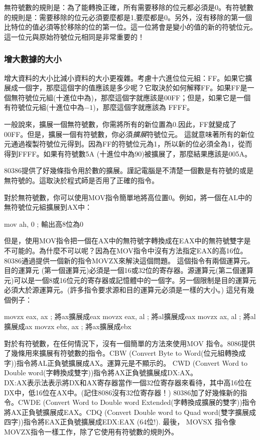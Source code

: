 無符號數的規則是：為了能轉換正確，所有需要移除的位元都必須是0。有符號數的規則是：需要移除的位元必須要麼都是1,要麼都是0。另外，沒有移除的第一個比特位的值必須等於移除的位的第一位。這一位將會是變小的值的新的符號位元。這一位元與原始符號位元相同是非常重要的！

\subsubsection{增大數據的大小}

增大資料的大小比減小資料的大小更複雜。考慮十六進位位元組：FF。如果它擴展成一個字，那麼這個字的值應該是多少呢？它取決於如何解釋FF。如果FF是一個無符號位元組(十進位中為)，那麼這個字就應該是00FF；但是，如果它是一個有符號位元組(十進位中為$-1$)，那麼這個字就應該為
FFFF。

一般說來，擴展一個無符號數，你需將所有的新位置為0.因此，FF就變成了00FF。但是，擴展一個有符號數，你必須\emph{擴展}符號位元。
這就意味著所有的新位元通過複製符號位元得到。因為FF的符號位元為1，所以新的位必須全為1，從而得到FFFF。如果有符號數5A
(十進位中為90)被擴展了，那麼結果應該是005A。

80386提供了好幾條指令用於數的擴展。謹記電腦是不清楚一個數是有符號的或是無符號的。這取決於程式師是否用了正確的指令。

對於無符號數，你可以使用{\code MOV}指令簡單地將高位置0。例如，將一個在AL中的無符號位元組擴展到AX中：
\begin{AsmCodeListing}[numbers=none,frame=none]
      mov    ah, 0   ; 輸出高8位為0
\end{AsmCodeListing}
但是，使用{\code MOV}指令把一個在AX中的無符號字轉換成在EAX中的無符號雙字是不可能的。為什麼不可以呢？因為在{\code MOV}指令中沒有方法指定EAX的高16位。80386通過提供一個新的指令{\code MOVZX}來解決這個問題。 這個指令有兩個運算元。目的運算元
(第一個運算元)必須是一個16或32位的寄存器。源運算元(第二個運算元)可以是一個8或16位元的寄存器或記憶體中的一個字。另一個限制是目的運算元必須大於源運算元。(許多指令要求源和目的運算元必須是一樣的大小。) 這兒有幾個例子：
\begin{AsmCodeListing}[numbers=none,frame=none]
      movzx  eax, ax      ; 將ax擴展成eax
      movzx  eax, al      ; 將al擴展成eax
      movzx  ax, al       ; 將al擴展成ax
      movzx  ebx, ax      ; 將ax擴展成ebx
\end{AsmCodeListing}

對於有符號數，在任何情況下，沒有一個簡單的方法來使用{\code MOV}
指令。8086提供了幾條用來擴展有符號數的指令。{\code CBW} 
(Convert Byte to
Word(位元組轉換成字))指令將AL正負號擴展成AX。運算元是不顯示的。{\code
CWD}  (Convert Word to Double
word(字轉換成雙字))指令將AX正負號擴展成DX:AX。 \\
DX:AX表示法表示將DX和AX寄存器當作一個32位寄存器來看待，其中高16位在DX中，低16位在AX中。(記住8086沒有32位寄存器！)
80386加了好幾條新的指令。{\code CWDE}  (Convert Word to
Double word
Extended(字轉換成擴展的雙字))指令將AX正負號擴展成EAX。{\code CDQ}
 (Convert Double word to Quad
word(雙字擴展成四字))指令將EAX正負號擴展成EDX:EAX
(64位!). 最後， {\code MOVSX} 指令像{\code
MOVZX}指令一樣工作，除了它使用有符號數的規則外。


